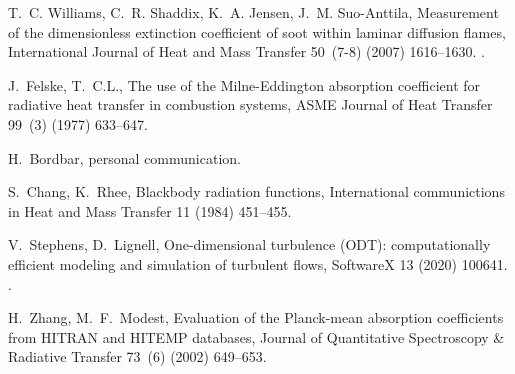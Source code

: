 \documentclass[preprint,12pt]{elsarticle}
\begin{document}
\begin{thebibliography}{10}
T.~C. Williams, C.~R. Shaddix, K.~A. Jensen, J.~M. Suo-Anttila, Measurement of
  the dimensionless extinction coefficient of soot within laminar diffusion
  flames, International Journal of Heat and Mass Transfer 50~(7-8) (2007)
  1616--1630.
\newblock \href {http://dx.doi.org/10.1016/j.ijheatmasstransfer.2006.08.024}
  {}.

J.~Felske, T.~C.L., The use of the {M}ilne-{E}ddington absorption coefficient
  for radiative heat transfer in combustion systems, ASME Journal of Heat
  Transfer 99~(3) (1977) 633--647.

H.~Bordbar, personal communication.

S.~Chang, K.~Rhee, Blackbody radiation functions, International communictions
  in Heat and Mass Transfer 11 (1984) 451--455.

V.~Stephens, D.~Lignell, One-dimensional turbulence ({ODT}): computationally
  efficient modeling and simulation of turbulent flows, Software{X} 13 (2020)
  100641.
\newblock \href {http://dx.doi.org/10.1016/j.softx.2020.100641}
  {}.
  
H.~Zhang, M.~F.~Modest, Evaluation of the Planck-mean absorption coefficients from HITRAN and HITEMP databases, Journal of Quantitative Spectroscopy \& Radiative Transfer 73~(6) (2002) 649--653.

\end{thebibliography}

\end{document}
